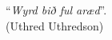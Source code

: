 \thispagestyle{empty}
\begin{center}
%
\end{center}
\vspace{21cm}

\begin{flushright}
``\emph{Wyrd bið ful aræd}''.  \\ (Uthred Uthredson)
\end{flushright}
